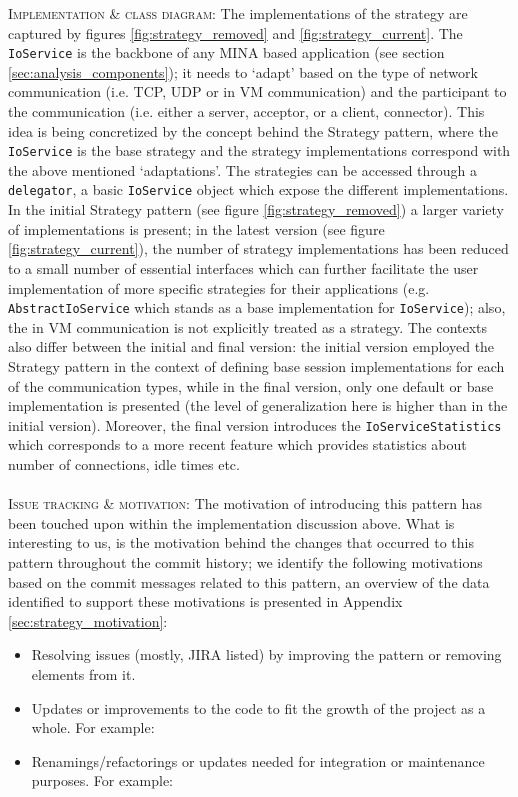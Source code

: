 \textsc{Implementation \& class diagram}: The implementations of the strategy are captured by figures \ref{fig:strategy_removed} and \ref{fig:strategy_current}. The \texttt{IoService} is the backbone of any MINA based application (see section \ref{sec:analysis_components}); it needs to `adapt' based on the type of network communication (i.e. TCP, UDP or in VM communication) and the participant to the communication (i.e. either a server, acceptor, or a client, connector). This idea is being concretized by the concept behind the Strategy pattern, where the \texttt{IoService} is the base strategy and the strategy implementations correspond with the above mentioned `adaptations'. The strategies can be accessed through a \texttt{delegator}, a basic \texttt{IoService} object which expose the different implementations. In the initial Strategy pattern (see figure \ref{fig:strategy_removed}) a larger variety of implementations is present; in the latest version (see figure \ref{fig:strategy_current}), the number of strategy implementations has been reduced to a small number of essential interfaces which can further facilitate the user implementation of more specific strategies for their applications (e.g. \texttt{AbstractIoService} which stands as a base implementation for \texttt{IoService}); also, the in VM communication is not explicitly treated as a strategy. The contexts also differ between the initial and final version: the initial version employed the Strategy pattern in the context of defining base session implementations for each of the communication types, while in the final version, only one default or base implementation is presented (the level of generalization here is higher than in the initial version). Moreover, the final version introduces the \texttt{IoServiceStatistics} which corresponds to a more recent feature which provides statistics about number of connections, idle times etc.\\\\
\textsc{Issue tracking \&  motivation}: The motivation of introducing this pattern has been touched upon within the implementation discussion above. What is interesting to us, is the motivation behind the changes that occurred to this pattern throughout the commit history; we identify the following motivations based on the commit messages related to this pattern, an overview of the data identified to support these motivations is presented in Appendix \ref{sec:strategy_motivation}:
\begin{itemize}
    \item Resolving issues (mostly, JIRA listed) by improving the pattern or removing elements from it.
    \item Updates or improvements to the code to fit the growth of the project as a whole. For example:
    \item Renamings/refactorings or updates needed for integration or maintenance purposes. For example:
\end{itemize}
